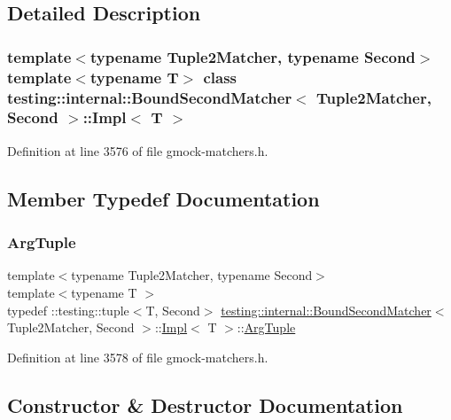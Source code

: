 \subsection{Detailed Description}
\subsubsection*{template$<$typename Tuple2\+Matcher, typename Second$>$\newline
template$<$typename T$>$\newline
class testing\+::internal\+::\+Bound\+Second\+Matcher$<$ Tuple2\+Matcher, Second $>$\+::\+Impl$<$ T $>$}



Definition at line 3576 of file gmock-\/matchers.\+h.



\subsection{Member Typedef Documentation}
\mbox{\label{classtesting_1_1internal_1_1BoundSecondMatcher_1_1Impl_acf41615a5de6421fc89fd38118fc6384}} 
\subsubsection{\texorpdfstring{Arg\+Tuple}{ArgTuple}}
{\footnotesize\ttfamily template$<$typename Tuple2\+Matcher, typename Second$>$ \\
template$<$typename T $>$ \\
typedef \+::testing\+::tuple$<$T, Second$>$ \hyperlink{classtesting_1_1internal_1_1BoundSecondMatcher}{testing\+::internal\+::\+Bound\+Second\+Matcher}$<$ Tuple2\+Matcher, Second $>$\+::\hyperlink{classtesting_1_1internal_1_1BoundSecondMatcher_1_1Impl}{Impl}$<$ T $>$\+::\hyperlink{classtesting_1_1internal_1_1BoundSecondMatcher_1_1Impl_acf41615a5de6421fc89fd38118fc6384}{Arg\+Tuple}}



Definition at line 3578 of file gmock-\/matchers.\+h.



\subsection{Constructor \& Destructor Documentation}
\mbox{\label{classtesting_1_1internal_1_1BoundSecondMatcher_1_1Impl_a352ff39ee60ec7eead0ddd82b8feaf1f}} 
